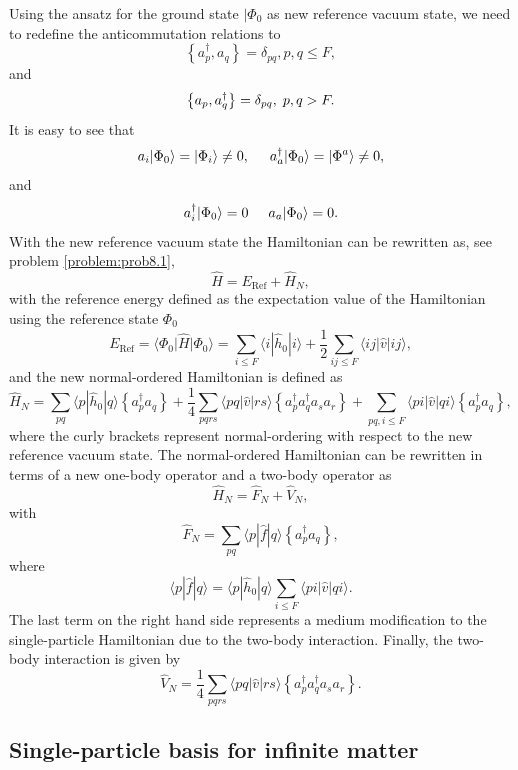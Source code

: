 Using the ansatz for the ground state $\vert \Phi_0$ as new reference
vacuum state, we need to redefine the anticommutation relations to
\[
\left\{a_p^\dagger, a_q \right\}= \delta_{pq}, p, q \leq F,
\]
and
\[
\left\{a_p, a_q^\dagger \right\} = \delta_{pq}, \hspace{0.1cm} p, q > F.
\]
It is easy to see that
\[
        a_i|\Phi_0\rangle = |\Phi_i\rangle\ne 0, \hspace{0.5cm}
        a_a^\dagger|\Phi_0\rangle = |\Phi^a\rangle\ne 0,
\]
and
\[
a_i^\dagger|\Phi_0\rangle = 0 \hspace{0.5cm} a_a|\Phi_0\rangle = 0.
\]
With the new reference vacuum state the Hamiltonian can be rewritten
as, see problem \ref{problem:prob8.1},
\[
\hat{H}=E_{\mathrm{Ref}}+\hat{H}_N,
\]
with the reference energy defined as the expectation value of the
Hamiltonian using the reference state $\Phi_0$
\[
E_{\mathrm{Ref}}=\langle \Phi_0 \vert \hat{H} \vert \Phi_0\rangle =
\sum_{i\le F} \langle i|\hat{h}_0|i\rangle + \frac{1}{2} \sum_{ij\le
  F}\langle ij|\hat{v}|ij\rangle,
\]
and the new normal-ordered Hamiltonian is defined as
\begin{equation}\label{eq:Hnormalorder}
\hat{H}_N = \sum_{pq} \langle p|\hat{h}_0|q\rangle \left\{a^\dagger_p
a_q\right\}+\frac{1}{4} \sum_{pqrs} \langle pq|\hat{v}|rs\rangle
\left\{a^\dagger_p a^\dagger_q a_s a_r\right\}+\sum_{pq,i\le F}
\langle pi|\hat{v}|qi\rangle \left\{a^\dagger_p a_q\right\},
\end{equation}
where the curly brackets represent normal-ordering with respect to the
new reference vacuum state.  The normal-ordered Hamiltonian can be
rewritten in terms of a new one-body operator and a two-body operator
as
\[
\hat{H}_N=\hat{F}_N+\hat{V}_N,
\]
with
\[
\hat{F}_N=\sum_{pq} \langle p|\hat{f}|q\rangle \left\{a^\dagger_pa_q\right\},
\]
where
\[
\langle p|\hat{f}|q\rangle= \langle p|\hat{h}_0|q\rangle \sum_{i\le F}
\langle pi|\hat{v}|qi\rangle.
\]
The last term on the right hand side represents a medium modification
to the single-particle Hamiltonian due to the two-body interaction.
Finally, the two-body interaction is given by
\[	     
\hat{V}_N = \frac{1}{4} \sum_{pqrs} \langle pq|\hat{v}|rs\rangle
\left\{a^\dagger_p a^\dagger_q a_s a_r\right\}.
\]

\subsection{Single-particle basis for infinite matter}

